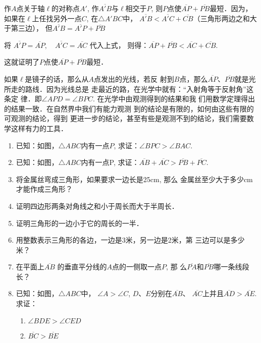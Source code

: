 \begin{solution}
    作$A$点关于轴$\ell$的对称点$A'$, 作$\overline{A'B}$与$\ell$相交于$P$, 
    则$P$点使$\overline{AP}+\overline{PB}$最短．因为，如果在$\ell$上任找另外一点$C$, 
    在$\triangle A'BC$中，
    $\overline{A'B}<\overline{A'C}+\overline{CB}$（三角形两边之和大于第三边），
    但$\overline{A'B}=\overline{A'P}+\overline{PB}$

将    $\overline{A'P}=\overline{AP},\quad \overline{A'C}=\overline{AC}$ 代入上式，
    则得：$\overline{AP}+\overline{PB}<\overline{AC}+\overline{CB}$.

    这就证明了$P$点使$\overline{AP}+\overline{PB}$最短．
\end{solution}

\begin{rmk}
    如果$\ell$是镜子的话，那么从$A$点发出的光线，若反
射到$B$点，那么$\overline{AP}$、$\overline{PB}$就是光所走的路线．因为光线总是
走最近的路，在光学中就有：“入射角等于反射角”这条定
律．即$\angle APD=\angle BPC$. 在光学中由观测得到的结果和我
们用数学定理得出的结果一致．在自然界中我们有能力观测
到的结论是有限的，如何由这些有限的可观测的结论，得到
更进一步的结论，甚至有些是观测不到的结论，我们需要数
学这样有力的工具．
\end{rmk}
    
\begin{ex}
\begin{enumerate}
    \item 已知：如图，$\triangle ABC$内有一点$P$, 
    求证：$\angle BPC>\angle BAC$.
    \item 已知：如图，$\triangle ABC$内有一点P,
    求证：$\overline{AB}+\overline{AC}>\overline{PB}+\overline{PC}$.
    \item 将金属丝弯成三角形，如果要求一边长是25cm, 那么
    金属丝至少大于多少cm才能作成三角形？
    \item 证明四边形两条对角线之和小于周长而大于半周长．
 \item 证明三角形的一边小于它的周长的一半．
 \item  用整数表示三角形的各边，一边是3米，另一边是2米，第
    三边可以是多少米？
\item  在平面上$\overline{AB}$
    的垂直平分线的$A$点的一侧取一点$P$, 那
    么$\overline{PA}$和$\overline{PB}$哪一条线段长？
\item 已知：如图，$\triangle ABC$中，
$\angle A>\angle C$, $D$、$E$分别在$\overline{AB}$、
    $\overline{AC}$上并且$\overline{AD}>\overline{AE}$.
    求证：
    \begin{enumerate}
        \item $\angle BDE> \angle CED$
        \item $\overline{BC}>\overline{BE}$
    \end{enumerate}
\end{enumerate}
\end{ex}
    
